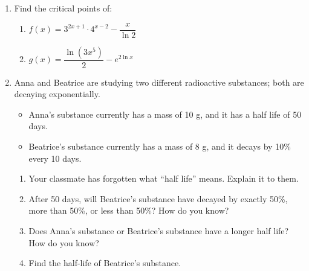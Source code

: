 \documentclass{article}
\theoremstyle{theorem}
\begin{document}
\begin{enumerate}
\begin{enumerate}

  \end{enumerate}

\item Find the critical points of:

  \begin{enumerate}
  \item
    \begin{problem}[\vfill]
      $f(x) = 3^{2x + 1} \cdot 4^{x - 2} - \dfrac{x}{\ln 2}$
    \end{problem}

  \item
    \begin{problem}[\vfill\newpage]
      $g(x) = \dfrac{\ln(3x^5)}{2} - e^{2 \ln x}$
    \end{problem}

  \end{enumerate}

\item
  Anna and Beatrice are studying two different radioactive substances; both are decaying exponentially. 
  \begin{itemize}[nosep]
  \item Anna's substance currently has a mass of 10 g, and it has a half life of 50 days.
  \item Beatrice's substance currently has a mass of 8 g, and it decays by 10\% every 10 days. 
  \end{itemize}

  \begin{enumerate}
  \item
    \begin{problem}[\vfill]
      Your classmate has forgotten what ``half life'' means. Explain it to them. 
    \end{problem}

  \item
    \begin{problem}[\vfill]
      After 50 days, will Beatrice's substance have decayed by exactly 50\%, more than 50\%, or less than 50\%? How do you know?
    \end{problem}

  \item
    \begin{problem}[\vfill]
      Does Anna's substance or Beatrice's substance have a longer half life? How do you know?
    \end{problem}

  \item
    \begin{problem}[\nstretch{2.5}]
      Find the half-life of Beatrice's substance. 
    \end{problem}


\end{enumerate}
\end{enumerate}
\end{document}
